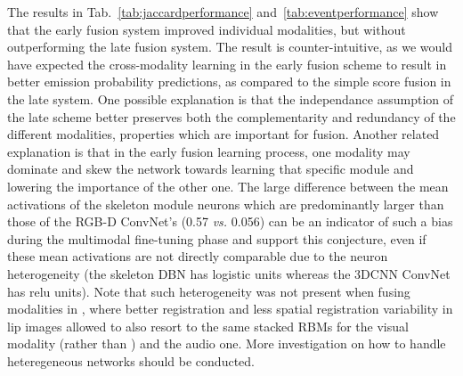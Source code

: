 %
The results in Tab.~\ref{tab:jaccardperformance} and~\ref{tab:eventperformance} show that the early fusion system
improved individual modalities, but without outperforming the late fusion system.
%
The result is counter-intuitive, as we would have expected the cross-modality learning in the early fusion scheme
to result in better emission probability predictions, as compared to the simple score fusion in the late system.
%
One possible explanation is that the independance assumption of the late scheme better preserves both
the complementarity and redundancy of the different modalities, properties which are important for fusion.
%
Another related explanation is that in the early fusion learning process,
one modality may dominate and  skew the network towards  learning that specific module and
lowering the importance of the other one.
%
The large difference between the mean activations of the  skeleton module neurons which are predominantly larger than those of the
RGB-D ConvNet's (0.57 \emph{vs.} 0.056) can be an indicator of such a bias during the multimodal fine-tuning phase and
support this conjecture, even if these mean activations are not directly comparable
due to the neuron heterogeneity (the skeleton DBN has logistic units whereas the 3DCNN ConvNet has relu units).
%
Note that such heterogeneity was not present when fusing modalities  in \cite{Ngiam2011multimodal},
where better registration and less spatial registration variability in lip images
allowed to also resort to the same stacked RBMs for the visual modality (rather than \ThreeDCNN)  and the audio one.
%
More investigation on how to handle heteregeneous networks  should be conducted.


%

